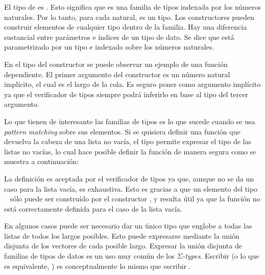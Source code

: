
El tipo de   es  \AgdaSymbol{$\rightarrow$} . Esto significa que   es una familia de tipos indexada por los números naturales. Por lo tanto, para cada  natural,   es un tipo. Los constructores pueden construir elementos de cualquier tipo dentro de la familia. Hay una diferencia sustancial entre parámetros e índices de un tipo de dato. Se dice que  está parametrizado por un tipo  e indexado sobre los números naturales. 

En el tipo del constructor \AgdaFunction{\_::\_} se puede observar un ejemplo de una función dependiente. El primer argumento del constructor es un número natural  implícito, el cual es el largo de la cola. Es seguro poner  como argumento implícito ya que el verificador de tipos siempre podrá inferirlo en base al tipo del tercer argumento. 

Lo que tienen de interesante las familias de tipos es lo que sucede cuando se usa \textit{pattern matching} sobre sus elementos. Si se quisiera definir una función que devuelva la cabeza de una lista no vacía, el tipo  permite expresar el tipo de las listas no vacías, lo cual hace posible definir la función  de manera segura como se muestra a continuación: 


La definición es aceptada por el verificador de tipos ya que, aunque no se da un caso para la lista vacía, es exhaustiva. Esto es gracias a que un elemento del tipo \mbox{  \AgdaSymbol{(} \AgdaSymbol{)}} sólo puede ser construído por el constructor \AgdaFunction{\_::\_}, y resulta útil ya que la función  no está correctamente definida para el caso de la lista vacía.  

En algunos casos puede ser necesario dar un único tipo que englobe a todas las listas de todos los largos posibles. Esto puede expresarse mediante la unión disjunta de los vectores de cada posible largo. Expresar la unión disjunta de familias de tipos de datos es un uso muy común de los $\Sigma$\textit{-types}. Escribir  \AgdaSymbol{(} \AgdaSymbol{)} (o lo que es equivalente,  \AgdaSymbol{($\lambda$}  \AgdaSymbol{$\rightarrow$}  \AgdaSymbol{)}) es conceptualmente lo mismo que escribir  . 

